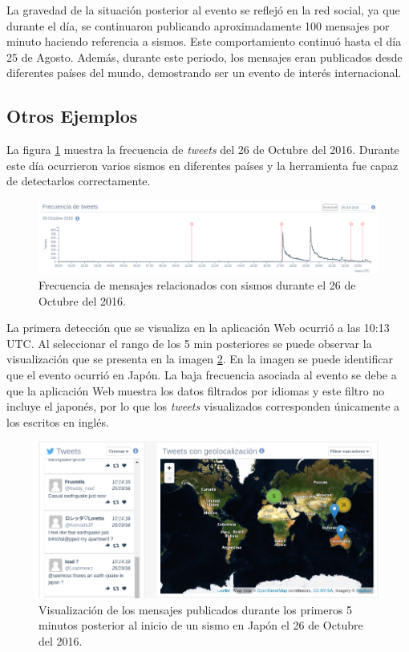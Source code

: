 	La gravedad de la situación posterior al evento se reflejó en la red social, ya que durante el día, se continuaron publicando aproximadamente 100 mensajes por minuto haciendo referencia a sismos. Este comportamiento continuó hasta el día 25 de Agosto. Además, durante este periodo, los mensajes eran publicados desde diferentes países del mundo, demostrando ser un evento de interés internacional.
	
	
	\subsection{Otros Ejemplos}
	
	
	La figura \ref{fig:timeline-26Oct} muestra la frecuencia de \textit{tweets} del 26 de Octubre del 2016. Durante este día ocurrieron varios sismos en diferentes países y la herramienta fue capaz de detectarlos correctamente. 
	
	\begin{figure}[!h]
	  \centering
	  \includegraphics[width=\textwidth]{imagenes/26Octubrefreq.png}
	  \caption{Frecuencia de mensajes relacionados con sismos durante el 26 de Octubre del 2016.}
		\label{fig:timeline-26Oct}
	\end{figure}
	
	La primera detección que se visualiza en la aplicación Web ocurrió a las 10:13 UTC. Al seleccionar el rango de los 5 min posteriores se puede observar la visualización que se presenta en la imagen \ref{fig:sismojapon}. En la imagen se puede identificar que el evento ocurrió en Japón. La baja frecuencia asociada al evento se debe a que la aplicación Web muestra los datos filtrados por idiomas y este filtro no incluye el japonés, por lo que los \textit{tweets} visualizados corresponden únicamente a los escritos en inglés. 
	
	\begin{figure}[!h]
	  \centering
	  \includegraphics[width=\textwidth]{imagenes/sismoJapon.png}
	  \caption{Visualización de los mensajes publicados durante los primeros 5 minutos posterior al inicio de un sismo en Japón el 26 de Octubre del 2016.}
		\label{fig:sismojapon}
	\end{figure}
	
